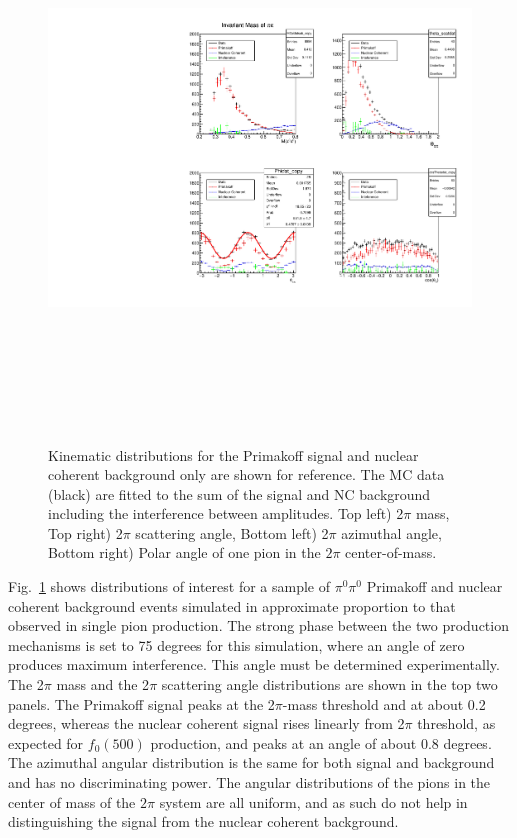  \begin{figure}[tbp]
\begin{center}
\includegraphics[height=15cm,clip=true]{figures/twopi_primakoff_DSelect_test_File_100000_decomposition_PrimNC.pdf}
\caption{Kinematic distributions for the Primakoff signal and nuclear coherent background only are shown for reference. The MC data (black) are fitted to the sum of the signal and NC background including the interference between amplitudes. 
Top left) 2$\pi$ mass, Top right) 2$\pi$ scattering angle, Bottom left) 2$\pi$ azimuthal angle, 
Bottom right) Polar angle of one pion in the $2\pi$ center-of-mass.
\label{fig:decomposition_PrimNC}}
\end{center} 
\end{figure}

Fig.~\ref{fig:decomposition_PrimNC} shows distributions of interest
for a sample of $\pi^0\pi^0$ Primakoff and nuclear coherent background
events simulated in approximate proportion to that observed in single pion
production. The strong phase between the two production mechanisms is
set to 75 degrees for this simulation, where an angle of zero produces
maximum interference. This angle must be determined experimentally.
The 2$\pi$ mass and the 2$\pi$ scattering angle distributions are
shown in the top two panels. The Primakoff signal peaks at the
2$\pi$-mass threshold and at about 0.2 degrees, whereas the nuclear
coherent signal rises linearly from 2$\pi$ threshold, as expected for
$f_0(500)$ production, and peaks at an angle of about 0.8
degrees. The azimuthal angular distribution is the same for both
signal and background and has no discriminating power. The angular
distributions of the pions in the center of mass of the $2\pi$ system
are all uniform, and as such do not help in distinguishing the signal
from the nuclear coherent background.

